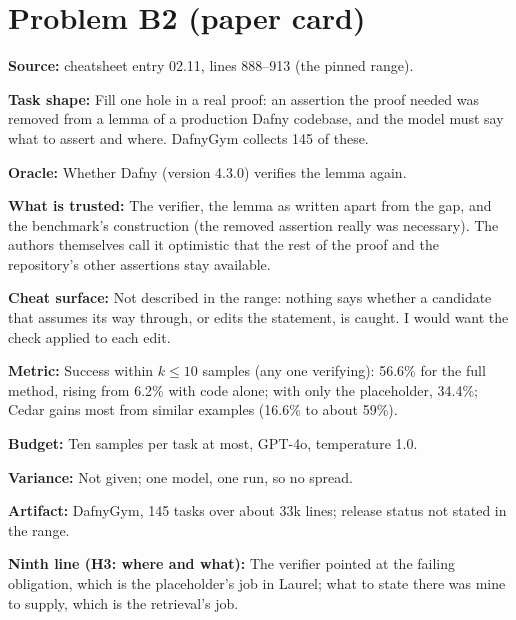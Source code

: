 \documentclass[11pt]{article}
\begin{document}
\section*{Problem B2 (paper card)}\label{ans:B2}
\begin{answer}
\textbf{Source:} cheatsheet entry 02.11, lines 888--913 (the pinned range).

\textbf{Task shape:} Fill one hole in a real proof: an assertion the proof
needed was removed from a lemma of a production Dafny codebase, and the model
must say what to assert and where. DafnyGym collects 145 of these.

\textbf{Oracle:} Whether Dafny (version 4.3.0) verifies the lemma again.

\textbf{What is trusted:} The verifier, the lemma as written apart from the
gap, and the benchmark's construction (the removed assertion really was
necessary). The authors themselves call it optimistic that the rest of the
proof and the repository's other assertions stay available.

\textbf{Cheat surface:} Not described in the range: nothing says whether a
candidate that assumes its way through, or edits the statement, is caught. I
would want the check applied to each edit.

\textbf{Metric:} Success within $k \le 10$ samples (any one verifying):
56.6\% for the full method, rising from 6.2\% with code alone; with only the
placeholder, 34.4\%; Cedar gains most from similar examples (16.6\% to about
59\%).

\textbf{Budget:} Ten samples per task at most, GPT-4o, temperature 1.0.

\textbf{Variance:} Not given; one model, one run, so no spread.

\textbf{Artifact:} DafnyGym, 145 tasks over about 33k lines; release status
not stated in the range.

\textbf{Ninth line (H3: where and what):} The verifier pointed at the failing
obligation, which is the placeholder's job in Laurel; what to state there was
mine to supply, which is the retrieval's job.
\end{answer}
\end{document}

